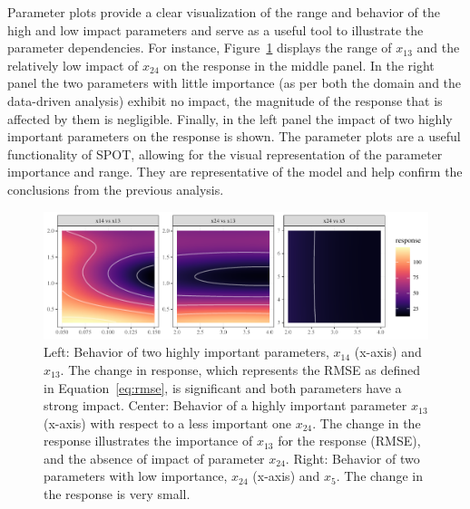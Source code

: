 \documentclass[conference]{IEEEtran}
\begin{document}
Parameter plots provide a clear visualization of the range and behavior of the high and low impact parameters and serve as a useful tool to illustrate the parameter dependencies. 
For instance, Figure~\ref{fig:model-contours} displays the range of \emph{$x_{13}$} and the relatively low impact of \emph{$x_{24}$} on the response in the middle panel. 
In the right panel the two parameters with little importance (as per both the domain and the data-driven analysis) exhibit no impact, the magnitude of the response that is affected by them is negligible.
Finally, in the left panel the impact of two highly important parameters on the response is shown.
The parameter plots are a useful functionality of \gls{SPOT}, allowing for the visual representation of the parameter importance and range. They are representative of the model and help confirm the conclusions from the previous analysis.


\begin{figure}
  \centering
  \includegraphics{model-contour.pdf}
  \caption{Left: 
  Behavior of two highly important parameters, \emph{$x_{14}$} (x-axis) and \emph{$x_{13}$}. 
  The change in response, which represents the \gls{RMSE} as defined in Equation~\ref{eq:rmse}, is significant and both parameters have a strong impact.
  Center: Behavior of a highly important parameter \emph{$x_{13}$} (x-axis) with respect to a less important one \emph{$x_{24}$}. The change in the response illustrates the importance of \emph{$x_{13}$} for the response (\gls{RMSE}), and the absence of impact of parameter \emph{$x_{24}$}.
  Right: Behavior of two parameters with low importance, \emph{$x_{24}$} (x-axis) and \emph{$x_{5}$}.
  The change in the response is very small.
  }
  \label{fig:model-contours}
\end{figure}
\end{document}
